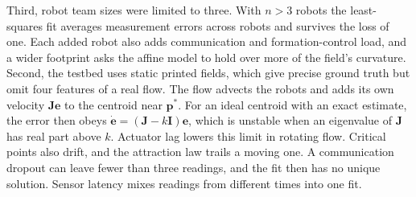 %
Third, robot team sizes were limited to three. With $n > 3$ robots the least-squares fit averages measurement errors across robots and survives the loss of one. Each added robot also adds communication and formation-control load, and a wider footprint asks the affine model to hold over more of the field's curvature.
%
Second, the testbed uses static printed fields, which give precise ground truth but omit four features of a real flow. The flow advects the robots and adds its own velocity $\mathbf{J}\mathbf{e}$ to the centroid near $\mathbf{p}^*$. For an ideal centroid with an exact estimate, the error then obeys $\dot{\mathbf{e}} = (\mathbf{J} - k\mathbf{I})\mathbf{e}$, which is unstable when an eigenvalue of $\mathbf{J}$ has real part above $k$. Actuator lag lowers this limit in rotating flow. Critical points also drift, and the attraction law trails a moving one. A communication dropout can leave fewer than three readings, and the fit then has no unique solution. Sensor latency mixes readings from different times into one fit.
